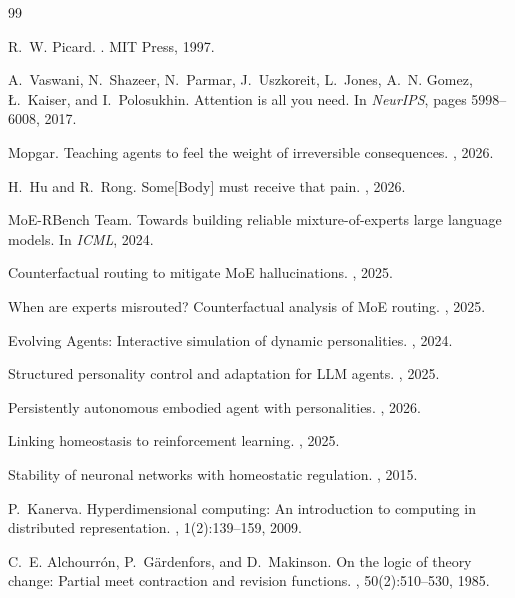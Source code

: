 \documentclass[11pt]{article}
\begin{document}
\begin{thebibliography}{99}

R.~W. Picard.
.
\newblock MIT Press, 1997.

A.~Vaswani, N.~Shazeer, N.~Parmar, J.~Uszkoreit, L.~Jones, A.~N. Gomez, {\L}.~Kaiser, and I.~Polosukhin.
\newblock Attention is all you need.
\newblock In {\em NeurIPS}, pages 5998--6008, 2017.

Mopgar.
\newblock Teaching agents to feel the weight of irreversible consequences.
, 2026.

H.~Hu and R.~Rong.
\newblock Some[Body] must receive that pain.
, 2026.

MoE-RBench Team.
\newblock Towards building reliable mixture-of-experts large language models.
\newblock In {\em ICML}, 2024.

Counterfactual routing to mitigate MoE hallucinations.
, 2025.

When are experts misrouted? Counterfactual analysis of MoE routing.
, 2025.

Evolving Agents: Interactive simulation of dynamic personalities.
, 2024.

Structured personality control and adaptation for LLM agents.
, 2025.

Persistently autonomous embodied agent with personalities.
, 2026.

Linking homeostasis to reinforcement learning.
, 2025.

Stability of neuronal networks with homeostatic regulation.
, 2015.

P.~Kanerva.
\newblock Hyperdimensional computing: An introduction to computing in distributed representation.
, 1(2):139--159, 2009.

C.~E. Alchourr\'{o}n, P.~G\"{a}rdenfors, and D.~Makinson.
\newblock On the logic of theory change: Partial meet contraction and revision functions.
, 50(2):510--530, 1985.


\end{thebibliography}
\end{document}
